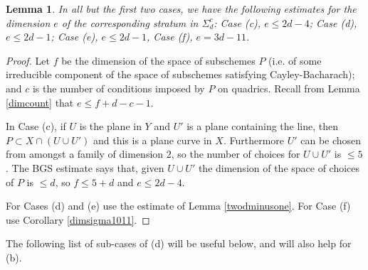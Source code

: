 \documentclass{amsart}
\theoremstyle{plain}
\newtheorem{lemma}[theorem]{Lemma}
\numberwithin{equation}{section}
\begin{document}
\begin{lemma}
\label{dimcount1}
In all but the first two cases, we have the following estimates for the dimension 
$e$ of the corresponding stratum in $\Sigma ^c_d$: 
Case (c), $e\leq 2d-4$; Case (d), $e\leq 2d-1$; Case (e), $e\leq 2d-1$, 
Case (f), $e= 3d-11$.
\end{lemma}
\begin{proof}
Let $f$ be the dimension of the space of subschemes $P$ (i.e. of some irreducible component
of the space of subschemes satisfying Cayley-Bacharach); and $c$ is the number of conditions
imposed by $P$ on quadrics. Recall from Lemma \ref{dimcount} that $e\leq f+d-c-1$.

In Case (c), if $U$ is the plane in $Y$ and $U'$ is a plane containing the line,
then $P \subset X\cap (U\cup U')$ and this is a plane curve in $X$. Furthermore $U'$ can be chosen from amongst a family of dimension $2$, so the number of choices for $U\cup U'$ is $\leq 5$. 
The BGS estimate \cite{BGS}
says that, given $U\cup U'$ the dimension of the space of choices of $P$ is $\leq d$,
so $f\leq 5+d$ and $e\leq 2d-4$. 

For Cases (d) and (e) use the estimate of Lemma \ref{twodminusone}.
For Case (f) use Corollary \ref{dimsigma1011}.
\end{proof}

The following list of sub-cases of (d) will be useful below, and will also
help for (b). 
\end{document}
